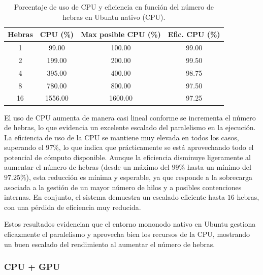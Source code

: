 \begin{table}[ht]
    \centering
    \begin{tabular}{|c|c|c|c|}
        \hline
        \textbf{Hebras} & \textbf{CPU (\%)} & \textbf{Max posible CPU (\%)} & \textbf{Efic. CPU (\%)} \\
        \hline
        1               & 99.00             & 100.00                        & 99.00                   \\
        2               & 199.00            & 200.00                        & 99.50                   \\
        4               & 395.00            & 400.00                        & 98.75                   \\
        8               & 780.00            & 800.00                        & 97.50                   \\
        16              & 1556.00           & 1600.00                       & 97.25                   \\
        \hline
    \end{tabular}
    \caption{Porcentaje de uso de CPU y eficiencia en función del número de hebras en Ubuntu nativo (CPU).}
    \label{tab:single-node_ubuntu_cpu_native_cpu}
\end{table}

El uso de CPU aumenta de manera casi lineal conforme se incrementa el número de hebras, lo que evidencia un excelente escalado del paralelismo en la ejecución. La eficiencia de uso de la CPU se mantiene muy elevada en todos los casos, superando el $97\%$, lo que indica que prácticamente se está aprovechando todo el potencial de cómputo disponible. Aunque la eficiencia disminuye ligeramente al aumentar el número de hebras (desde un máximo del $99\%$ hasta un mínimo del $97.25\%$), esta reducción es mínima y esperable, ya que responde a la sobrecarga asociada a la gestión de un mayor número de hilos y a posibles contenciones internas. En conjunto, el sistema demuestra un escalado eficiente hasta $16$ hebras, con una pérdida de eficiencia muy reducida.

Estos resultados evidencian que el entorno mononodo nativo en Ubuntu gestiona eficazmente el paralelismo y aprovecha bien los recursos de la CPU, mostrando un buen escalado del rendimiento al aumentar el número de hebras.

\subsubsection{CPU + GPU}

